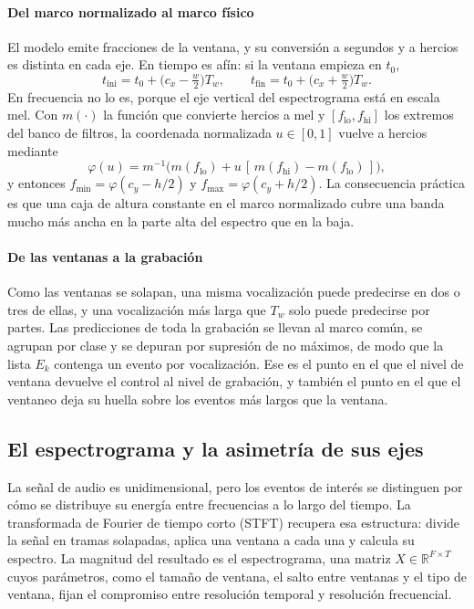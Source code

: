 \paragraph{Del marco normalizado al marco físico}
El modelo emite fracciones de la ventana, y su conversión a segundos y a hercios
es distinta en cada eje. En tiempo es afín: si la
ventana empieza en $t_0$,
\begin{equation}
    t_{\text{ini}} = t_0 + \bigl(c_x - \tfrac{w}{2}\bigr) T_w,
    \qquad
    t_{\text{fin}} = t_0 + \bigl(c_x + \tfrac{w}{2}\bigr) T_w.
\end{equation}
En frecuencia no lo es, porque el eje vertical del espectrograma está en escala
mel. Con $m(\cdot)$ la función que convierte hercios a mel y $[f_{\text{lo}},
            f_{\text{hi}}]$ los extremos del banco de filtros, la coordenada normalizada
$u \in [0, 1]$ vuelve a hercios mediante
\begin{equation}
    \varphi(u) = m^{-1}\!\bigl(m(f_{\text{lo}}) + u\,[\,m(f_{\text{hi}}) -
            m(f_{\text{lo}})\,]\bigr),
    \label{eq:mel-inv}
\end{equation}
y entonces $f_{\min} = \varphi(c_y - h/2)$ y $f_{\max} = \varphi(c_y + h/2)$. La
consecuencia práctica es que una caja de altura constante en el marco normalizado
cubre una banda mucho más ancha en la parte alta del espectro que en la baja.

\paragraph{De las ventanas a la grabación}
Como las ventanas se solapan, una misma vocalización puede predecirse en dos o
tres de ellas, y una vocalización más larga que $T_w$ solo puede predecirse por
partes. Las predicciones de toda la grabación se llevan al marco común, se
agrupan por clase y se depuran por supresión de no máximos, de modo que la lista
$E_k$ contenga un evento por vocalización. Ese es el punto en el que el nivel de
ventana devuelve el control al nivel de grabación, y también el punto en el que
el ventaneo deja su huella sobre los eventos más largos que la ventana.

\subsection{El espectrograma y la asimetría de sus ejes}
\label{sec:stft}

La señal de audio es unidimensional, pero los eventos de interés se distinguen
por cómo se distribuye su energía entre frecuencias a lo largo del tiempo. La
transformada de Fourier de tiempo corto (STFT) recupera esa estructura: divide
la señal en tramas solapadas, aplica una ventana a cada una y calcula su
espectro. La magnitud del resultado es el espectrograma, una matriz
$X \in \mathbb{R}^{F\times T}$ cuyos parámetros, como el tamaño de ventana, el salto
entre ventanas y el tipo de ventana, fijan el compromiso entre resolución
temporal y resolución frecuencial.

